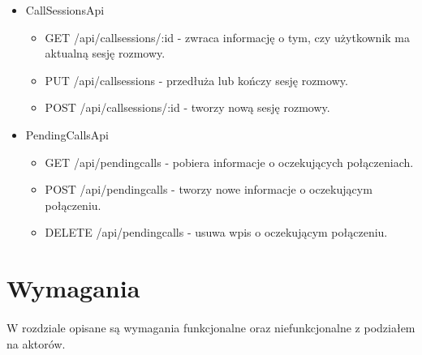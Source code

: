 \documentclass{article}
\begin{document}
\begin{itemize}
    \item CallSessionsApi
    \begin{itemize}
      \item GET /api/callsessions/:id - zwraca informację o tym, czy użytkownik ma aktualną sesję rozmowy.
      \item PUT /api/callsessions - przedłuża lub kończy sesję rozmowy.
      \item POST /api/callsessions/:id - tworzy nową sesję rozmowy.
    \end{itemize}

    \item PendingCallsApi
    \begin{itemize}
      \item GET /api/pendingcalls - pobiera informacje o oczekujących połączeniach.
      \item POST /api/pendingcalls - tworzy nowe informacje o oczekującym połączeniu.
      \item DELETE /api/pendingcalls - usuwa wpis o oczekującym połączeniu.
    \end{itemize}


  \end{itemize}
  \section{Wymagania}
  \paragraph{} W rozdziale opisane są wymagania funkcjonalne oraz niefunkcjonalne z podziałem na aktorów.
\end{document}
